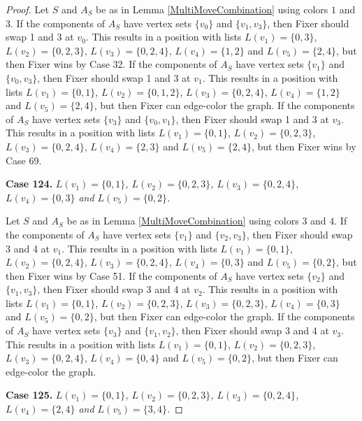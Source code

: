 \documentclass[12pt]{amsart}
\theoremstyle{plain}
\theoremstyle{definition}
\theoremstyle{remark}
\begin{document}
\begin{proof}
Let $S$ and $A_S$ be as in Lemma \ref{MultiMoveCombination} using colors $1$ and $3$. If the components of $A_S$ have vertex sets $\{v_0\}$ and $\{v_1, v_3\}$, then Fixer should swap 1 and 3 at $v_0$. This results in a position with lists $L(v_1) = \{0, 3\}$, $L(v_2) = \{0, 2, 3\}$, $L(v_3) = \{0, 2, 4\}$, $L(v_4) = \{1, 2\}$ and $L(v_5) = \{2, 4\}$, but then Fixer wins by Case 32.
If the components of $A_S$ have vertex sets $\{v_1\}$ and $\{v_0, v_3\}$, then Fixer should swap 1 and 3 at $v_1$. This results in a position with lists $L(v_1) = \{0, 1\}$, $L(v_2) = \{0, 1, 2\}$, $L(v_3) = \{0, 2, 4\}$, $L(v_4) = \{1, 2\}$ and $L(v_5) = \{2, 4\}$, but then Fixer can edge-color the graph.
If the components of $A_S$ have vertex sets $\{v_3\}$ and $\{v_0, v_1\}$, then Fixer should swap 1 and 3 at $v_3$. This results in a position with lists $L(v_1) = \{0, 1\}$, $L(v_2) = \{0, 2, 3\}$, $L(v_3) = \{0, 2, 4\}$, $L(v_4) = \{2, 3\}$ and $L(v_5) = \{2, 4\}$, but then Fixer wins by Case 69.

\noindent\textbf{Case 124.  }\textit{$L(v_1) = \{0, 1\}$, $L(v_2) = \{0, 2, 3\}$, $L(v_3) = \{0, 2, 4\}$, $L(v_4) = \{0, 3\}$ and $L(v_5) = \{0, 2\}$.}

Let $S$ and $A_S$ be as in Lemma \ref{MultiMoveCombination} using colors $3$ and $4$. If the components of $A_S$ have vertex sets $\{v_1\}$ and $\{v_2, v_3\}$, then Fixer should swap 3 and 4 at $v_1$. This results in a position with lists $L(v_1) = \{0, 1\}$, $L(v_2) = \{0, 2, 4\}$, $L(v_3) = \{0, 2, 4\}$, $L(v_4) = \{0, 3\}$ and $L(v_5) = \{0, 2\}$, but then Fixer wins by Case 51.
If the components of $A_S$ have vertex sets $\{v_2\}$ and $\{v_1, v_3\}$, then Fixer should swap 3 and 4 at $v_2$. This results in a position with lists $L(v_1) = \{0, 1\}$, $L(v_2) = \{0, 2, 3\}$, $L(v_3) = \{0, 2, 3\}$, $L(v_4) = \{0, 3\}$ and $L(v_5) = \{0, 2\}$, but then Fixer can edge-color the graph.
If the components of $A_S$ have vertex sets $\{v_3\}$ and $\{v_1, v_2\}$, then Fixer should swap 3 and 4 at $v_3$. This results in a position with lists $L(v_1) = \{0, 1\}$, $L(v_2) = \{0, 2, 3\}$, $L(v_3) = \{0, 2, 4\}$, $L(v_4) = \{0, 4\}$ and $L(v_5) = \{0, 2\}$, but then Fixer can edge-color the graph.

\noindent\textbf{Case 125.  }\textit{$L(v_1) = \{0, 1\}$, $L(v_2) = \{0, 2, 3\}$, $L(v_3) = \{0, 2, 4\}$, $L(v_4) = \{2, 4\}$ and $L(v_5) = \{3, 4\}$.}


\end{proof}
\end{document}
